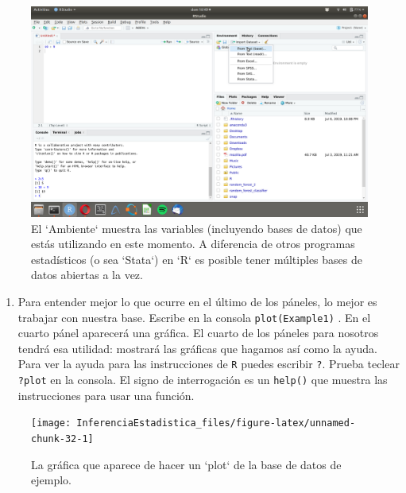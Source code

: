 \documentclass[
]{book}
\providecommand{\tightlist}{%
  \setlength{\itemsep}{0pt}\setlength{\parskip}{0pt}}
\begin{document}
\begin{figure}

{\centering \includegraphics[width=40in]{images/RStudio6} 

}

\caption{El `Ambiente` muestra las variables (incluyendo bases de datos) que estás utilizando en este momento. A diferencia de otros programas estadísticos (o sea `Stata`) en `R` es posible tener múltiples bases de datos abiertas a la vez.}\label{fig:unnamed-chunk-31}
\end{figure}

\begin{enumerate}
\def\labelenumi{\arabic{enumi}.}
\setcounter{enumi}{3}
\tightlist
\item
  Para entender mejor lo que ocurre en el último de los páneles, lo mejor es trabajar con nuestra base. Escribe en la consola \texttt{plot(Example1)} . En el cuarto pánel aparecerá una gráfica. El cuarto de los páneles para nosotros tendrá esa utilidad: mostrará las gráficas que hagamos así como la ayuda. Para ver la ayuda para las instrucciones de \texttt{R} puedes escribir \texttt{?}. Prueba teclear \texttt{?plot} en la consola. El signo de interrogación es un \texttt{help()} que muestra las instrucciones para usar una función.
\end{enumerate}

\begin{figure}

{\centering \texttt{[image: InferenciaEstadistica\_files/figure-latex/unnamed-chunk-32-1]} 

}

\caption{La gráfica que aparece de hacer un `plot` de la base de datos de ejemplo.}\label{fig:unnamed-chunk-32}
\end{figure}
\end{document}
